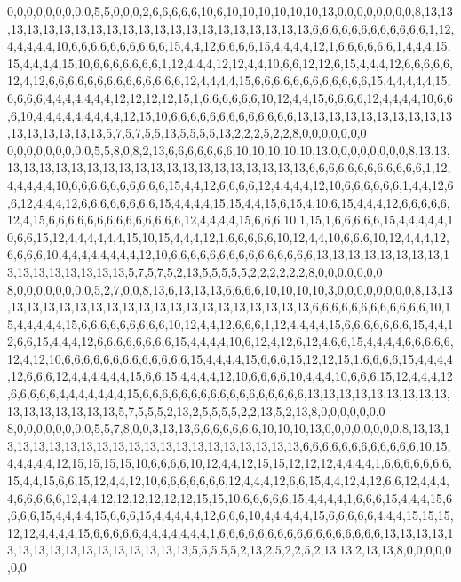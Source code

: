 0,0,0,0,0,0,0,0,0,5,5,0,0,0,2,6,6,6,6,6,10,6,10,10,10,10,10,10,13,0,0,0,0,0,0,0,0,8,13,13,13,13,13,13,13,13,13,13,13,13,13,13,13,13,13,13,13,13,13,6,6,6,6,6,6,6,6,6,6,6,6,1,12,4,4,4,4,4,10,6,6,6,6,6,6,6,6,6,6,15,4,4,12,6,6,6,6,15,4,4,4,4,12,1,6,6,6,6,6,6,1,4,4,4,15,15,4,4,4,4,15,10,6,6,6,6,6,6,6,1,12,4,4,4,12,12,4,4,10,6,6,12,12,6,15,4,4,4,12,6,6,6,6,6,12,4,12,6,6,6,6,6,6,6,6,6,6,6,6,6,6,12,4,4,4,4,15,6,6,6,6,6,6,6,6,6,6,6,6,15,4,4,4,4,4,15,6,6,6,6,4,4,4,4,4,4,4,12,12,12,12,15,1,6,6,6,6,6,6,10,12,4,4,15,6,6,6,6,12,4,4,4,4,10,6,6,6,10,4,4,4,4,4,4,4,4,4,12,15,10,6,6,6,6,6,6,6,6,6,6,6,6,6,13,13,13,13,13,13,13,13,13,13,13,13,13,13,13,13,5,7,5,7,5,5,13,5,5,5,5,13,2,2,2,5,2,2,8,0,0,0,0,0,0,0
0,0,0,0,0,0,0,0,0,5,5,8,0,8,2,13,6,6,6,6,6,6,6,10,10,10,10,10,13,0,0,0,0,0,0,0,0,8,13,13,13,13,13,13,13,13,13,13,13,13,13,13,13,13,13,13,13,13,13,6,6,6,6,6,6,6,6,6,6,6,6,1,12,4,4,4,4,4,10,6,6,6,6,6,6,6,6,6,6,15,4,4,12,6,6,6,6,12,4,4,4,4,12,10,6,6,6,6,6,6,1,4,4,12,6,6,12,4,4,4,12,6,6,6,6,6,6,6,6,15,4,4,4,4,15,15,4,4,15,6,15,4,10,6,15,4,4,4,12,6,6,6,6,6,12,4,15,6,6,6,6,6,6,6,6,6,6,6,6,6,6,12,4,4,4,4,15,6,6,6,10,1,15,1,6,6,6,6,6,15,4,4,4,4,4,10,6,6,15,12,4,4,4,4,4,4,15,10,15,4,4,4,12,1,6,6,6,6,6,10,12,4,4,10,6,6,6,10,12,4,4,4,12,6,6,6,6,10,4,4,4,4,4,4,4,4,12,10,6,6,6,6,6,6,6,6,6,6,6,6,6,6,6,13,13,13,13,13,13,13,13,13,13,13,13,13,13,13,13,5,7,5,7,5,2,13,5,5,5,5,5,2,2,2,2,2,2,8,0,0,0,0,0,0,0
8,0,0,0,0,0,0,0,0,5,2,7,0,0,8,13,6,13,13,13,6,6,6,6,10,10,10,10,3,0,0,0,0,0,0,0,0,8,13,13,13,13,13,13,13,13,13,13,13,13,13,13,13,13,13,13,13,13,13,6,6,6,6,6,6,6,6,6,6,6,6,10,15,4,4,4,4,4,15,6,6,6,6,6,6,6,6,6,10,12,4,4,12,6,6,6,1,12,4,4,4,4,15,6,6,6,6,6,6,6,15,4,4,12,6,6,15,4,4,4,12,6,6,6,6,6,6,6,6,15,4,4,4,4,10,6,12,4,12,6,12,4,6,6,15,4,4,4,4,6,6,6,6,6,12,4,12,10,6,6,6,6,6,6,6,6,6,6,6,6,6,15,4,4,4,4,15,6,6,6,15,12,12,15,1,6,6,6,6,15,4,4,4,4,12,6,6,6,12,4,4,4,4,4,4,15,6,6,15,4,4,4,4,12,10,6,6,6,6,10,4,4,4,10,6,6,6,15,12,4,4,4,12,6,6,6,6,6,4,4,4,4,4,4,4,15,6,6,6,6,6,6,6,6,6,6,6,6,6,6,6,6,6,13,13,13,13,13,13,13,13,13,13,13,13,13,13,13,13,5,7,5,5,5,2,13,2,5,5,5,5,2,2,13,5,2,13,8,0,0,0,0,0,0,0
8,0,0,0,0,0,0,0,0,5,5,7,8,0,0,3,13,13,6,6,6,6,6,6,6,10,10,10,13,0,0,0,0,0,0,0,0,8,13,13,13,13,13,13,13,13,13,13,13,13,13,13,13,13,13,13,13,13,13,6,6,6,6,6,6,6,6,6,6,6,6,10,15,4,4,4,4,4,12,15,15,15,15,10,6,6,6,6,10,12,4,4,12,15,15,12,12,12,4,4,4,4,1,6,6,6,6,6,6,6,15,4,4,15,6,6,15,12,4,4,12,10,6,6,6,6,6,6,6,12,4,4,4,12,6,6,15,4,4,12,4,12,6,6,12,4,4,4,4,6,6,6,6,6,12,4,4,12,12,12,12,12,12,15,15,10,6,6,6,6,6,15,4,4,4,4,1,6,6,6,15,4,4,4,15,6,6,6,6,15,4,4,4,4,15,6,6,6,15,4,4,4,4,4,12,6,6,6,10,4,4,4,4,4,15,6,6,6,6,6,4,4,4,15,15,15,12,12,4,4,4,4,15,6,6,6,6,6,4,4,4,4,4,4,4,1,6,6,6,6,6,6,6,6,6,6,6,6,6,6,6,6,6,13,13,13,13,13,13,13,13,13,13,13,13,13,13,13,13,5,5,5,5,5,2,13,2,5,2,2,5,2,13,13,2,13,13,8,0,0,0,0,0,0,0
